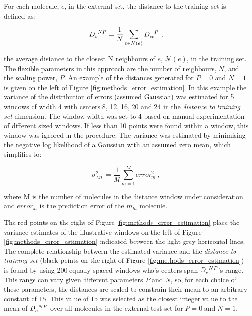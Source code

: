 \documentclass[10pt]{bmc_article}
\newenvironment{bmcformat}{\begin{raggedright}\baselineskip20pt\sloppy\setboolean{publ}{false}}{\end{raggedright}\baselineskip20pt\sloppy}
\begin{document}
\begin{bmcformat}
For each molecule, $e$, in the external set, the distance to the training set is defined as:

\begin{equation}
\tensor{D}{_e^N^P} = \frac{1}{N} \sum_{t \in \mathcal{N}(e)}{\tensor{D}{_e_t^P}}\ ,
\end{equation}


the average distance to the closest N neighbours of $e$, $\mathcal{N}(e)$, in the training set. The flexible parameters in this approach are the number of neighbours, $N$, and the scaling power, $P$. An example of the distances generated for $P=0$ and $N=1$ is given on the left of Figure \ref{fig:methods_error_estimation}. In this example the variance of the distribution of errors (assumed Gaussian) was estimated for 5 windows of width 4 with centers 8, 12, 16, 20 and 24 in the \textit{distance to training set} dimension. The window width was set to 4 based on manual experimentation of different sized windows. If less than 10 points were found within a window, this window was ignored in the procedure. The variance was estimated by minimising the negative log likelihood of a Gaussian with an assumed zero mean, which simplifies to: 

\begin{equation}
\sigma^2_{ML} = \frac{1}{M} \sum_{m=1}^{M}{error_m^2}\ ,
\end{equation}

where M is the number of molecules in the distance window under consideration and $error_m$ is the prediction error of the $m_{th}$ molecule. 

The red points on the right of Figure \ref{fig:methods_error_estimation} place the variance estimates of the illustrative windows on the left of Figure \ref{fig:methods_error_estimation} indicated between the light grey horizontal lines. The complete relationship between the estimated variance and the \textit{distance to training set} (black points on the right of Figure \ref{fig:methods_error_estimation}) is found by using 200 equally spaced windows who's centers span $\tensor{D}{_e^N^P}$'s range. This range can vary given different parameters $P$ and $N$, so, for each choice of these parameters, the distances are scaled to constrain their mean to an arbitrary constant of 15. This value of 15 was selected as the closest integer value to the mean of $\tensor{D}{_e^N^P}$ over all molecules in the external test set for $P=0$ and $N=1$.


\end{bmcformat}
\end{document}
